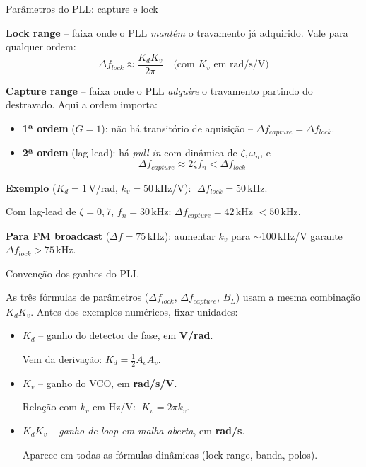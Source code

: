 \begin{frame}{Parâmetros do PLL: capture e lock}

\small\compacto

\textbf{Lock range} -- faixa onde o PLL \emph{mantém} o travamento já adquirido. Vale para qualquer ordem:
\[
\Delta f_{lock} \approx \frac{K_d K_v}{2\pi} \quad\text{(com $K_v$ em rad/s/V)}
\]

\pause
\textbf{Capture range} -- faixa onde o PLL \emph{adquire} o travamento partindo do destravado. Aqui a ordem importa:
\begin{itemize}\itemsep0pt
\item \textbf{1ª ordem} ($G=1$): não há transitório de aquisição -- $\Delta f_{capture} = \Delta f_{lock}$.
\item \textbf{2ª ordem} (lag-lead): há \emph{pull-in} com dinâmica de $\zeta, \omega_n$, e
\[
\Delta f_{capture} \approx 2\zeta f_n < \Delta f_{lock}
\]
\end{itemize}

\pause
\textbf{Exemplo} ($K_d = 1$\,V/rad, $k_v = 50$\,kHz/V): $\;\Delta f_{lock} = 50$\,kHz.

Com lag-lead de $\zeta = 0{,}7$, $f_n = 30$\,kHz: $\Delta f_{capture} = 42$\,kHz $< 50$\,kHz.

\pause
\textbf{Para FM broadcast} ($\Delta f = 75$\,kHz): aumentar $k_v$ para $\sim$100\,kHz/V garante $\Delta f_{lock} > 75$\,kHz.

\end{frame}


\begin{frame}{Convenção dos ganhos do PLL}

As três fórmulas de parâmetros ($\Delta f_{lock}$, $\Delta f_{capture}$, $B_L$) usam a mesma combinação $K_d K_v$. Antes dos exemplos numéricos, fixar unidades:

\pause
\vspace{0.3cm}
\begin{itemize}\itemsep0.3em
\item \textbf{$K_d$} -- ganho do detector de fase, em \textbf{V/rad}.

Vem da derivação: $K_d = \frac{1}{2}A_c A_v$.

\pause
\item \textbf{$K_v$} -- ganho do VCO, em \textbf{rad/s/V}.

Relação com $k_v$ em Hz/V: $\;K_v = 2\pi k_v$.

\pause
\item \textbf{$K_d K_v$} -- \emph{ganho de loop em malha aberta}, em \textbf{rad/s}.

Aparece em todas as fórmulas dinâmicas (lock range, banda, polos).
\end{itemize}

\end{frame}

